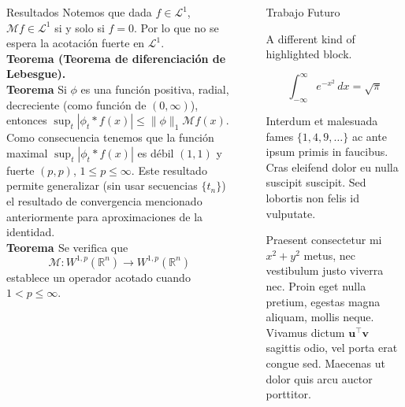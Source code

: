 \documentclass[final]{beamer}
\newlength{\sepwidth}
\newlength{\colwidth}
\newcommand{\separatorcolumn}{\begin{column}{\sepwidth}\end{column}}
\begin{document}
\begin{frame}[t]
\begin{columns}[t]
\begin{column}{\colwidth}
\begin{alertblock}{Resultados}
      \vspace{0.2cm}
      Notemos que dada $f\in \mathcal{L}^1$, $\mathcal{M}f \in \mathcal{L}^1$ si y solo si $f=0$. Por lo que no se espera la acotación fuerte en $\mathcal{L}^1$.\\
      \vspace{0.2cm}
    \textbf{Teorema (Teorema de diferenciación de Lebesgue).}\\
      \vspace{0.2cm}
    \textbf{Teorema} Si $\phi$ es una función positiva, radial, decreciente (como función de $(0,\infty)$), entonces $\sup_{t}|\phi_t\ast f(x)|\leq \|\phi\|_1\mathcal{M}f(x)$. Como consecuencia tenemos que la función maximal $\sup_{t}|\phi_t\ast f(x)|$ es débil $(1,1)$ y fuerte $(p,p)$, $1\leq p \leq \infty$. Este resultado permite generalizar (sin usar secuencias $\{t_n\}$) el resultado de convergencia mencionado anteriormente para aproximaciones de la identidad.\\ 
      \vspace{0.2cm}
      \textbf{Teorema \cite{MR1469106}} Se verifica  que
      \begin{equation*}
          \mathcal{M}:W^{1,p}(\mathbb{R}^n)\rightarrow W^{1,p}(\mathbb{R}^n) 
      \end{equation*}
      establece un operador acotado cuando $1<p\leq \infty$.
  \end{alertblock}

\end{column}

\separatorcolumn

\begin{column}{\colwidth}

  \begin{exampleblock}{Trabajo Futuro}

    A different kind of highlighted block.

    $$
    \int_{-\infty}^{\infty} e^{-x^2}\,dx = \sqrt{\pi}
    $$

    Interdum et malesuada fames $\{1, 4, 9, \ldots\}$ ac ante ipsum primis in
    faucibus. Cras eleifend dolor eu nulla suscipit suscipit. Sed lobortis non
    felis id vulputate.


    Praesent consectetur mi $x^2 + y^2$ metus, nec vestibulum justo viverra
    nec. Proin eget nulla pretium, egestas magna aliquam, mollis neque. Vivamus
    dictum $\mathbf{u}^\intercal\mathbf{v}$ sagittis odio, vel porta erat
    congue sed. Maecenas ut dolor quis arcu auctor porttitor.


\end{exampleblock}
\end{column}
\end{columns}
\end{frame}
\end{document}
